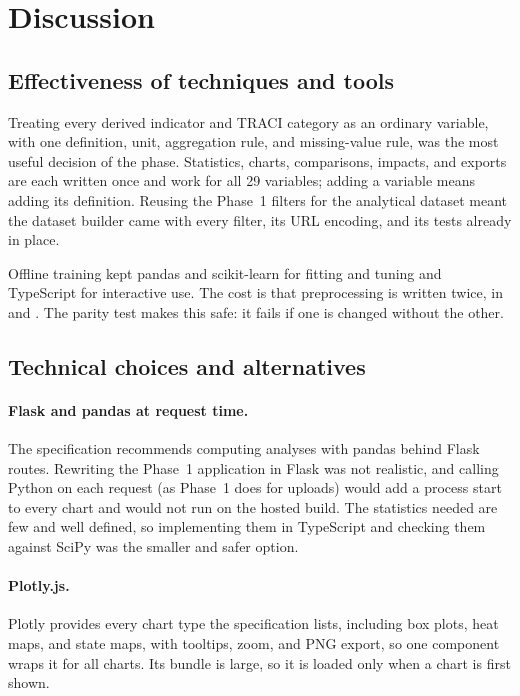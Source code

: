 \documentclass[11pt,a4paper]{article}
\begin{document}
\section{Discussion}
\label{sec:discussion}

\subsection{Effectiveness of techniques and tools}

Treating every derived indicator and TRACI category as an ordinary variable, with one
definition, unit, aggregation rule, and missing-value rule, was the most useful decision of the
phase. Statistics, charts, comparisons, impacts, and exports are each written once and work for
all 29 variables; adding a variable means adding its definition. Reusing the Phase~1 filters for
the analytical dataset meant the dataset builder came with every filter, its URL encoding, and
its tests already in place.

Offline training kept pandas and scikit-learn for fitting and tuning and TypeScript for
interactive use. The cost is that preprocessing is written twice, in  and
. The parity test makes this safe: it fails if one is changed without the other.

\subsection{Technical choices and alternatives}

\paragraph{Flask and pandas at request time.} The specification recommends computing analyses
with pandas behind Flask routes. Rewriting the Phase~1 application in Flask was not realistic,
and calling Python on each request (as Phase~1 does for uploads) would add a process start to
every chart and would not run on the hosted build. The statistics needed are few and well
defined, so implementing them in TypeScript and checking them against SciPy was the smaller and
safer option.

\paragraph{Plotly.js.} Plotly provides every chart type the specification lists, including box
plots, heat maps, and state maps, with tooltips, zoom, and PNG export, so one component wraps it
for all charts. Its bundle is large, so it is loaded only when a chart is first shown.
\end{document}
